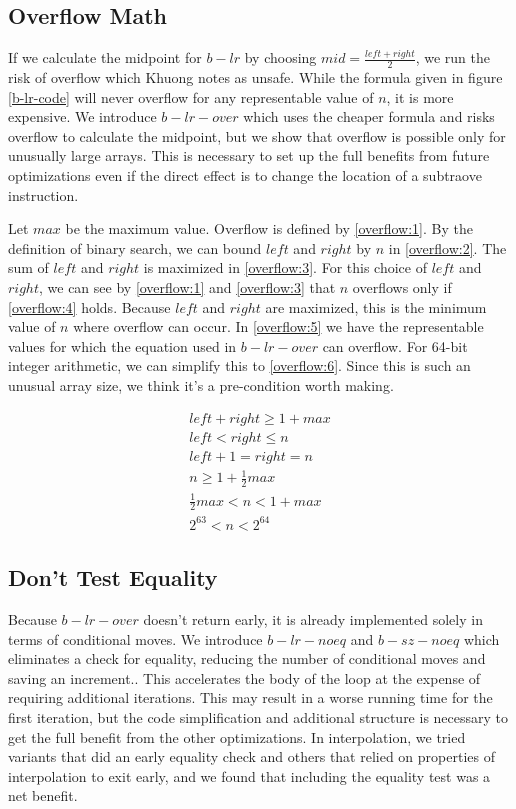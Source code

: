 \documentclass[twocolumn]{article}
\begin{document}
\subsection{Overflow Math}
\label{overflow}
If we calculate the midpoint for $b-lr$ by choosing $mid = \frac{left+right}{2}$, we run the risk of overflow which Khuong notes as unsafe. \cite{pvk-search-retro} While the formula given in figure \ref{b-lr-code} will never overflow for any representable value of $n$, it is more expensive. We introduce $b-lr-over$ which uses the cheaper formula and risks overflow to calculate the midpoint, but we show that overflow is possible only for unusually large arrays. This is necessary to set up the full benefits from future optimizations even if the direct effect is to change the location of a subtraove instruction.

Let $max$ be the maximum value. Overflow is defined by \eqref{overflow:1}. By the definition of binary search, we can bound $left$ and $right$ by $n$ in \eqref{overflow:2}. The sum of $left$ and $right$ is maximized in \eqref{overflow:3}. For this choice of $left$ and $right$, we can see by \eqref{overflow:1} and \eqref{overflow:3} that $n$ overflows only if \eqref{overflow:4} holds. Because $left$ and $right$ are maximized, this is the minimum value of $n$ where overflow can occur. In \eqref{overflow:5} we have the representable values for which the equation used in $b-lr-over$ can overflow. For 64-bit integer arithmetic, we can simplify this to \eqref{overflow:6}. Since this is such an unusual array size, we think it's a pre-condition worth making.

\begin{align}
left + right \geq 1 + max \label{overflow:1}
\\ left < right \leq n \label{overflow:2}
\\ left + 1 = right = n \label{overflow:3}
\\ n \geq 1 + \frac{1}{2}max \label{overflow:4}
\\ \frac{1}{2}max < n < 1 + max \label{overflow:5}
\\ 2^{63} < n < 2^{64} \label{overflow:6}
\end{align}

\subsection{Don't Test Equality}
\label{noeq}
Because $b-lr-over$ doesn't return early, it is already implemented solely in terms of conditional moves. We introduce $b-lr-noeq$ and $b-sz-noeq$ which eliminates a check for equality, reducing the number of conditional moves and saving an increment.. This accelerates the body of the loop at the expense of requiring additional iterations. This may result in a worse running time for the first iteration, but the code simplification and additional structure is necessary to get the full benefit from the other optimizations. In interpolation, we tried variants that did an early equality check and others that relied on properties of interpolation to exit early, and we found that including the equality test was a net benefit.
\end{document}
